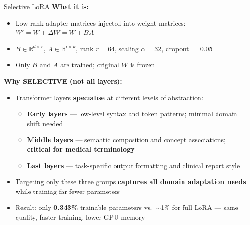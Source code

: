 ﻿\documentclass[aspectratio=169]{beamer}
\newcommand{\scite}[1]{{\footnotesize\color{darkgray}\citet{#1}}}
\begin{document}
\begin{frame}{Selective LoRA}
\vspace{0.2em}
\textbf{What it is:} \scite{lora2022hu}
\begin{itemize}
    \item Low-rank adapter matrices injected into weight matrices: $W' = W + \Delta W = W + BA$
    \item $B \in \mathbb{R}^{d \times r}$, $A \in \mathbb{R}^{r \times k}$, rank $r = 64$, scaling $\alpha = 32$, dropout $= 0.05$
    \item Only $B$ and $A$ are trained; original $W$ is frozen
\end{itemize}
\vspace{0.4em}
\textbf{Why SELECTIVE (not all layers):}
\begin{itemize}
    \item Transformer layers \textbf{specialise} at different levels of abstraction:
    \begin{itemize}
        \item \textbf{Early layers} --- low-level syntax and token patterns; minimal domain shift needed
        \item \textbf{Middle layers} --- semantic composition and concept associations; \textbf{critical for medical terminology}
        \item \textbf{Last layers} --- task-specific output formatting and clinical report style
    \end{itemize}
    \item Targeting only these three groups \textbf{captures all domain adaptation needs} while training far fewer parameters
    \item Result: only \textbf{0.343\%} trainable parameters vs.\ $\sim$1\% for full LoRA --- same quality, faster training, lower GPU memory
\end{itemize}
\end{frame}
\end{document}
